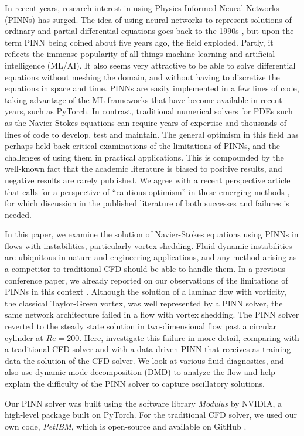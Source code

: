 
In recent years, research interest in using Physics-Informed Neural Networks (PINNs) has surged.
The idea of using neural networks to represent solutions of ordinary and partial differential equations goes back to the 1990s \cite{dissanayake_neural-network-based_1994,lagaris_artificial_1998}, but upon the term PINN being coined about five years ago, the field exploded. 
Partly, it reflects the immense popularity of all things machine learning and artificial intelligence (ML/AI). 
It also seems very attractive to be able to solve differential equations without meshing the domain, and without having to discretize the equations in space and time. 
PINNs are easily implemented in a few lines of code, taking advantage of the ML frameworks that have become available in recent years, such as PyTorch. 
In contrast, traditional numerical solvers for PDEs such as the Navier-Stokes equations can require years of expertise and thousands of lines of code to develop, test and maintain. 
The general optimism in this field has perhaps held back critical examinations of the limitations of PINNs, and the challenges of using them in practical applications. 
This is compounded by the well-known fact that the academic literature is biased to positive results, and negative results are rarely published. 
We agree with a recent perspective article that calls for a perspective of ``cautious optimism'' in these emerging methods \cite{vinuesa_emerging_2022}, for which discussion in the published literature of both successes and failures is needed.

In this paper, we examine the solution of Navier-Stokes equations using PINNs in flows with instabilities, particularly vortex shedding. 
Fluid dynamic instabilities are ubiquitous in nature and engineering applications, and any method arising as a competitor to traditional CFD should be able to handle them. 
In a previous conference paper, we already reported on our observations of the limitations of PINNs in this context \cite{chuang_predicting_2020}. 
Although the solution of a laminar flow with vorticity, the classical Taylor-Green vortex, was well represented by a PINN solver, the same network architecture failed in a flow with vortex shedding. 
The PINN solver reverted to the steady state solution in two-dimensional flow past a circular cylinder at $Re=200$. 
Here, investigate this failure in more detail, comparing with a traditional CFD solver and with a data-driven PINN that receives as training data the solution of the CFD solver. 
We look at various fluid diagnostics, and also use dynamic mode decomposition (DMD) to analyze the flow and help explain the difficulty of the PINN solver to capture oscillatory solutions.

Our PINN solver was built using the software library \emph{Modulus} by NVIDIA, a high-level package built on PyTorch.
For the traditional CFD solver, we used our own code, \emph{PetIBM}, which is open-source and available on GitHub \cite{chuang_petibm_2018}.